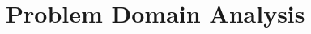 \documentclass[../../master.tex]{subfiles}
\begin{document}
\chapter{Problem Domain Analysis}\label{ch:ProblemDomain}



\end{document}

